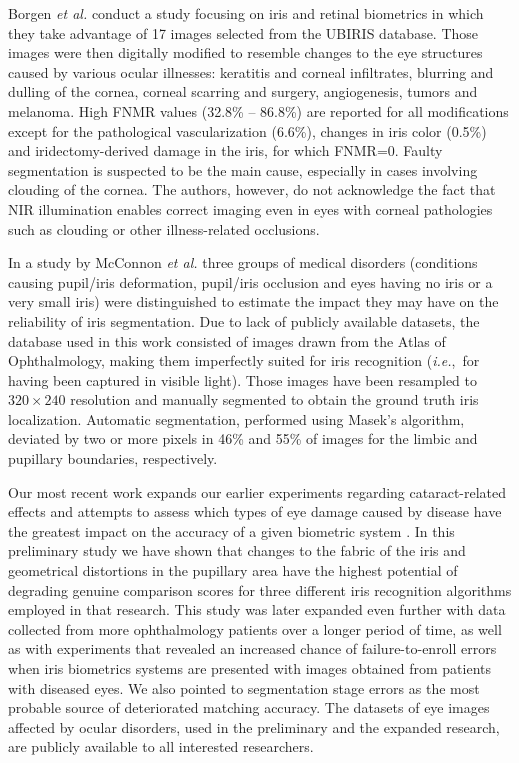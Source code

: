 \documentclass[article,12pt]{elsarticle}
\newcommand{\ie}{{\it i.e.},~}
\begin{document}
Borgen \emph{et al.} \cite{Borgen} conduct a study focusing on iris and retinal biometrics in which they take advantage of 17 images selected from the UBIRIS database. Those images were then digitally modified to resemble changes to the eye structures caused by various ocular illnesses: keratitis and corneal infiltrates, blurring and dulling of the cornea, corneal scarring and surgery, angiogenesis, tumors and melanoma. High FNMR values (32.8\% -- 86.8\%) are reported for all modifications except for the pathological vascularization (6.6\%), changes in  iris color (0.5\%) and iridectomy-derived damage in the iris, for which FNMR=0. Faulty segmentation is suspected to be the main cause, especially in cases involving clouding of the cornea. The authors, however, do not acknowledge the fact that NIR illumination enables correct imaging even in eyes with corneal pathologies such as clouding or other illness-related occlusions.

In a study by McConnon \emph{et al.} \cite{McConnon2012} three groups of medical disorders (conditions causing pupil/iris deformation, pupil/iris occlusion and eyes having no iris or a very small iris) were distinguished to estimate the impact they may have on the reliability of iris segmentation. Due to lack of publicly available datasets, the database used in this work consisted of images drawn from the Atlas of Ophthalmology, making them imperfectly suited for iris recognition (\ie for having been captured in visible light). Those images have been resampled to $320\times240$ resolution and manually segmented to obtain the ground truth iris localization. Automatic segmentation, performed using Masek’s algorithm, deviated by two or more pixels in 46\% and 55\% of images for the limbic and pupillary boundaries, respectively.

Our most recent work expands our earlier experiments regarding cataract-related effects and attempts to assess which types of eye damage caused by disease have the greatest impact on the accuracy of a given biometric system \cite{TrokielewiczCYBCONF2015}. In this preliminary study we have shown that changes to the fabric of the iris and geometrical distortions in the pupillary area have the highest potential of degrading genuine comparison scores for three different iris recognition algorithms employed in that research. This study was later expanded even further \cite{TrokielewiczBTAS2015} with data collected from more ophthalmology patients over a longer period of time, as well as with experiments that revealed an increased chance of failure-to-enroll errors when iris biometrics systems are presented with images obtained from patients with diseased eyes. We also pointed to segmentation stage errors as the most probable source of deteriorated matching accuracy. The datasets of eye images affected by ocular disorders, used in the preliminary and the expanded research, are publicly available to all interested researchers.
\end{document}
